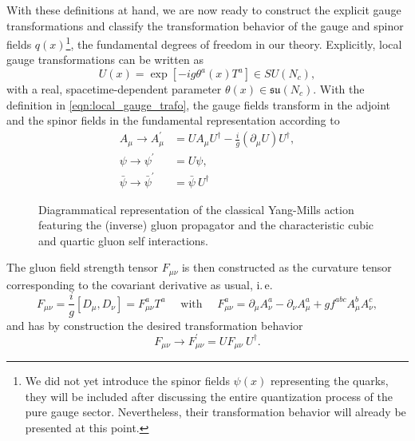 With these definitions at hand, we are now ready to construct the explicit gauge transformations and classify the transformation behavior of the gauge and spinor fields $q(x)$\footnote{We did not yet introduce the spinor fields $\psi(x)$ representing the quarks, they will be included after discussing the entire quantization process of the pure gauge sector. Nevertheless, their transformation behavior will already be presented at this point.}, the fundamental degrees of freedom in our theory. Explicitly, local gauge transformations can be written as
\begin{equation}
U(x)=\exp\left[-i g \theta^{a}(x) T^{a}\right] \in S U(N_{c}), \label{eqn:local_gauge_trafo}
\end{equation}
with a real, spacetime-dependent parameter $\theta(x) \in \mathfrak{su}(N_c)$. With the definition in  \eqref{eqn:local_gauge_trafo}, the gauge fields transform in the adjoint and the spinor fields in the fundamental representation according to
\begin{equation}
\begin{aligned}
A_{\mu} \rightarrow A_{\mu}^{\prime} &=U A_{\mu} U^{\dagger} -\frac{i}{g}\left(\partial_{\mu}U\right)U^{\dagger},\\
\psi \rightarrow \psi^{\prime} &=U \psi,\\
\bar{\psi} \rightarrow \bar{\psi}^{\prime} &=\bar{\psi}\ U^{\dagger} 
\end{aligned}
\end{equation}
\begin{figure}[t]
\centering

\caption{Diagrammatical representation of the classical Yang-Mills action featuring the (inverse) gluon propagator and the characteristic cubic and quartic gluon self interactions.}
\label{fig:ym_action}
\end{figure}
\hspace{-0.5em} The gluon field strength tensor $F_{\mu\nu}$ is then constructed as the curvature tensor corresponding to the covariant derivative as usual, i.\,e. 
\begin{equation}
F_{\mu \nu}=\frac{i}{g}\left[D_{\mu}, D_{\nu}\right]=F_{\mu \nu}^{a} T^{a} \quad \text { with } \quad F_{\mu \nu}^{a}=\partial_{\mu} A_{\nu}^{a}-\partial_{\nu} A_{\mu}^{a}+g f^{a b c} A_{\mu}^{b} A_{\nu}^{c},
\end{equation}
and has by construction the desired transformation behavior
\begin{equation}
F_{\mu \nu} \rightarrow F^{\prime}_{\mu \nu}=U F_{\mu \nu}\ U^{\dagger}.
\end{equation}
